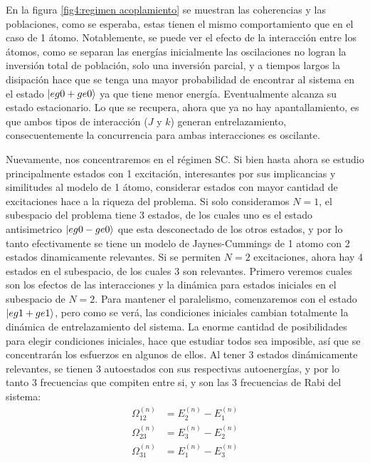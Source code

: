 En  la figura \ref{fig4:regimen acoplamiento} se muestran las coherencias y las poblaciones, como se esperaba, estas tienen el mismo comportamiento que en el caso de 1 átomo. Notablemente, se puede ver el efecto de la interacción entre los átomos, como se separan las energías inicialmente las oscilaciones no logran la inversión total de población, solo una inversión parcial, y a tiempos largos la disipación hace que se tenga una mayor probabilidad de encontrar al sistema en el estado $\ket{eg0+ge0}$ ya que tiene menor energía. Eventualmente alcanza su estado estacionario. Lo que se recupera, ahora que ya no hay apantallamiento, es que ambos tipos de interacción ($J$ y $k$) generan entrelazamiento, consecuentemente la concurrencia para ambas interacciones es oscilante.

Nuevamente, nos concentraremos en el régimen SC. Si bien hasta ahora se estudio principalmente estados con 1 excitación, interesantes por sus implicancias y similitudes al modelo de 1 átomo, considerar estados con mayor cantidad de excitaciones hace a la riqueza del problema. Si solo consideramos $N=1$, el subespacio del problema tiene 3 estados, de los cuales uno es el estado antisimetrico $\ket{eg0-ge0}$ que esta desconectado de los otros estados, y por lo tanto efectivamente se tiene un modelo de Jaynes-Cummings de 1 atomo con 2 estados dinamicamente relevantes. Si se permiten $N=2$ excitaciones, ahora hay 4 estados en el subespacio, de los cuales 3 son relevantes. Primero veremos cuales son los efectos de las interacciones y la dinámica para estados iniciales en el subespacio de $N=2$. Para mantener el paralelismo, comenzaremos con el estado $\ket{eg1+ge1}$, pero como se verá, las condiciones iniciales cambian totalmente la dinámica de entrelazamiento del sistema. La enorme cantidad de posibilidades para elegir condiciones iniciales, hace que estudiar todos sea imposible, así que se  concentrarán los esfuerzos en algunos de ellos.
Al tener 3 estados dinámicamente relevantes, se tienen 3 autoestados con sus respectivas autoenergías, y por lo tanto 3 frecuencias que compiten entre si, y son las 3 frecuencias de Rabi del sistema:
\begin{equation}
    \begin{aligned}
        \Omega^{(n)}_{12} &= E^{(n)}_2-E^{(n)}_1 \\
        \Omega^{(n)}_{23} &=E^{(n)}_3-E^{(n)}_2 \\
        \Omega^{(n)}_{31} &= E^{(n)}_1-E^{(n)}_3         
    \end{aligned}
    \label{ec4:frecuencias de rabi}
\end{equation}
